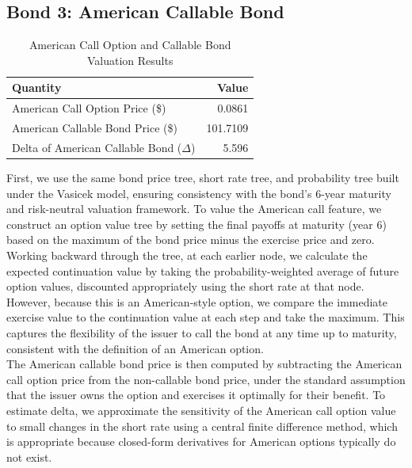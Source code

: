 \documentclass{article}
\begin{document}
\subsection{Bond 3: American Callable Bond}

\begin{table}[ht]
\centering
\begin{tabular}{l r}
\hline
Quantity & Value \\
\hline
American Call Option Price (\$) & 0.0861 \\
American Callable Bond Price (\$) & 101.7109 \\
Delta of American Callable Bond ($ \Delta  $) & 5.596 \\
\hline
\end{tabular}
\caption{American Call Option and Callable Bond Valuation Results}
\end{table}


First, we use the same bond price tree, short rate tree, and probability tree built under the Vasicek model, ensuring consistency with the bond’s 6-year maturity and risk-neutral valuation framework. To value the American call feature, we construct an option value tree by setting the final payoffs at maturity (year 6) based on the maximum of the bond price minus the exercise price and zero. \\

Working backward through the tree, at each earlier node, we calculate the expected continuation value by taking the probability-weighted average of future option values, discounted appropriately using the short rate at that node. However, because this is an American-style option, we compare the immediate exercise value to the continuation value at each step and take the maximum. This captures the flexibility of the issuer to call the bond at any time up to maturity, consistent with the definition of an American option. \\

The American callable bond price is then computed by subtracting the American call option price from the non-callable bond price, under the standard assumption that the issuer owns the option and exercises it optimally for their benefit. To estimate delta, we approximate the sensitivity of the American call option value to small changes in the short rate using a central finite difference method, which is appropriate because closed-form derivatives for American options typically do not exist. \\
\end{document}
